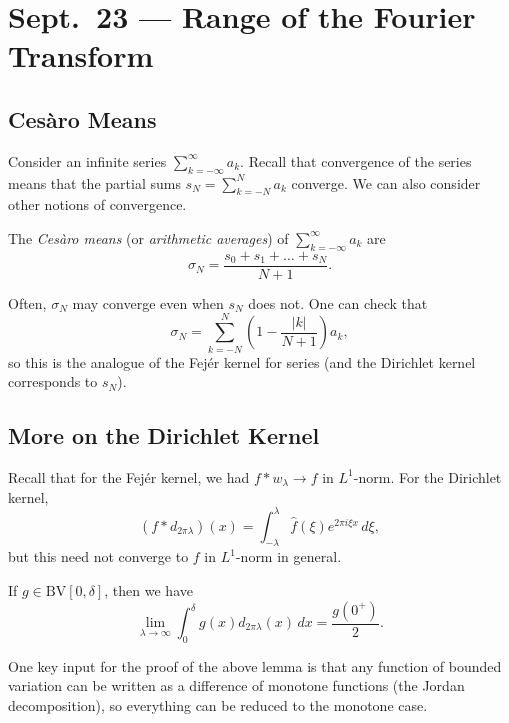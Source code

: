\chapter{Sept.~23 --- Range of the Fourier Transform}

\section{Ces\`aro Means}

\begin{remark}
  Consider an infinite series
  $\sum_{k = -\infty}^\infty a_k$. Recall
  that convergence of the series means that
  the partial sums
  $s_N = \sum_{k = -N}^N a_k$ converge.
  We can also consider other notions of convergence.
\end{remark}

\begin{definition}
  The \emph{Ces\`aro means} (or \emph{arithmetic averages})
  of $\sum_{k = - \infty}^\infty a_k$ are
  \[
    \sigma_N = \frac{s_0 + s_1 + \dots + s_N}{N + 1}.
  \]
\end{definition}

\begin{remark}
  Often, $\sigma_N$ may converge even when $s_N$ does
  not. One can check that
  \[
    \sigma_N = \sum_{k = -N}^N \left(1 - \frac{|k|}{N + 1}\right) a_k,
  \]
  so this is the analogue of the
  Fej\'er kernel for series (and the Dirichlet kernel
  corresponds to $s_N$).
\end{remark}

\section{More on the Dirichlet Kernel}

\begin{remark}
  Recall that for the Fej\'er kernel,
  we had $f * w_\lambda \to f$ in $L^1$-norm.
  For the Dirichlet kernel,
  \[
    (f * d_{2\pi \lambda})(x)
    = \int_{-\lambda}^\lambda \widehat{f}(\xi) e^{2\pi i \xi x}\, d\xi,
  \]
  but this need not converge to $f$ in
  $L^1$-norm in general.
\end{remark}

\begin{lemma}
  If $g \in \mathrm{BV}[0, \delta]$, then we have
  \[
    \lim_{\lambda \to \infty} \int_0^\delta g(x) d_{2\pi \lambda}(x)\, dx
    = \frac{g(0^+)}{2}.
  \]
\end{lemma}

\begin{remark}
  One key input for the proof of the above lemma
  is that any function of bounded variation can be
  written as a difference of monotone functions
  (the Jordan decomposition), so
  everything can be reduced to the monotone case.
\end{remark}

